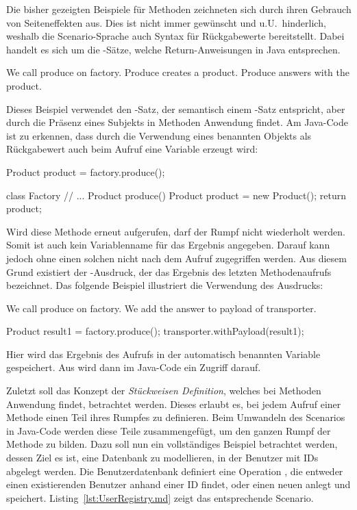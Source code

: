 Die bisher gezeigten Beispiele für Methoden zeichneten sich durch ihren Gebrauch von Seiteneffekten aus.
Dies ist nicht immer gewünscht und u.U.\ hinderlich, weshalb die Scenario-Sprache auch Syntax für Rückgabewerte bereitstellt.
Dabei handelt es sich um die -Sätze, welche Return-Anweisungen in Java entsprechen.

\begin{codeblock}
    We call produce on factory.
    Produce creates a product.
    Produce answers with the product.
\end{codeblock}

Dieses Beispiel verwendet den -Satz, der semantisch einem -Satz entspricht, aber durch die Präsenz eines Subjekts in Methoden Anwendung findet.
Am Java-Code ist zu erkennen, dass durch die Verwendung eines benannten Objekts als Rückgabewert auch beim Aufruf eine Variable erzeugt wird:

\begin{jcodeblock}
    Product product = factory.produce();

    class Factory {
        // ...
        Product produce() {
            Product product = new Product();
            return product;
        }
    }
\end{jcodeblock}

Wird diese Methode erneut aufgerufen, darf der Rumpf nicht wiederholt werden.
Somit ist auch kein Variablenname für das Ergebnis angegeben.
Darauf kann jedoch ohne einen solchen nicht nach dem Aufruf zugegriffen werden.
Aus diesem Grund existiert der -Ausdruck, der das Ergebnis des letzten Methodenaufrufs bezeichnet.
Das folgende Beispiel illustriert die Verwendung des Ausdrucks:

\begin{codeblock}
    We call produce on factory.
    We add the answer to payload of transporter.
\end{codeblock}

\begin{jcodeblock}
    Product result1 = factory.produce();
    transporter.withPayload(result1);
\end{jcodeblock}

Hier wird das Ergebnis des Aufrufs in der automatisch benannten Variable  gespeichert.
Aus  wird dann im Java-Code ein Zugriff darauf.

Zuletzt soll das Konzept der \emph{Stückweisen Definition}, welches bei Methoden Anwendung findet, betrachtet werden.
Dieses erlaubt es, bei jedem Aufruf einer Methode einen Teil ihres Rumpfes zu definieren.
Beim Umwandeln des Scenarios in Java-Code werden diese Teile zusammengefügt, um den ganzen Rumpf der Methode zu bilden.
Dazu soll nun ein vollständiges Beispiel betrachtet werden, dessen Ziel es ist, eine Datenbank zu modellieren, in der Benutzer mit IDs abgelegt werden.
Die Benutzerdatenbank definiert eine Operation , die entweder einen existierenden Benutzer anhand einer ID findet, oder einen neuen anlegt und speichert.
Listing~\ref{lst:UserRegistry.md} zeigt das entsprechende Scenario.

